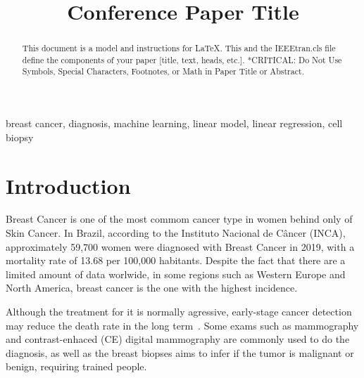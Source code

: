 \documentclass[conference]{IEEEtran}
\begin{document}
\title{Conference Paper Title}

\author{
\and
{}
}

\maketitle

\begin{abstract}
This document is a model and instructions for \LaTeX.
This and the IEEEtran.cls file define the components of your paper [title, text, heads, etc.]. *CRITICAL: Do Not Use Symbols, Special Characters, Footnotes, 
or Math in Paper Title or Abstract.
\end{abstract}

\begin{IEEEkeywords}
breast cancer, diagnosis, machine learning, linear model, linear regression, cell biopsy
\end{IEEEkeywords}

\section{Introduction}

Breast Cancer is one of the most commom cancer type in women behind only of Skin Cancer. In Brazil, according to the Instituto Nacional de Câncer (INCA), approximately 59,700 women were diagnosed with Breast Cancer in 2019, with a mortality rate of 13.68 per 100,000 habitants. 
Despite the fact that there are a limited amount of data worlwide, in some regions such as Western Europe and North America,
breast cancer is the one with the highest incidence.

Although the treatment for it is normally agressive, early-stage cancer detection may reduce the death rate in the long term~\cite{b1}. 
Some exams such as mammography and contrast-enhaced (CE) digital mammography are commonly used to do the diagnosis, as well as the breast biopses aims to infer if the tumor is malignant or benign, requiring trained people. 
\end{document}
